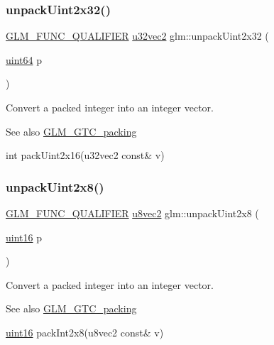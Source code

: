 \subsubsection{\texorpdfstring{unpack\+Uint2x32()}{unpackUint2x32()}}
{\footnotesize\ttfamily \mbox{\hyperlink{setup_8hpp_a33fdea6f91c5f834105f7415e2a64407}{G\+L\+M\+\_\+\+F\+U\+N\+C\+\_\+\+Q\+U\+A\+L\+I\+F\+I\+ER}} \mbox{\hyperlink{group__gtc__type__precision_gad854a1005ce84d8f6e8f05e42893f5c9}{u32vec2}} glm\+::unpack\+Uint2x32 (\begin{DoxyParamCaption}\item[{\mbox{\hyperlink{group__gtc__type__precision_gae3632bf9b37da66233d78930dd06378a}{uint64}}}]{p }\end{DoxyParamCaption})}

Convert a packed integer into an integer vector.

\begin{DoxySeeAlso}{See also}
\mbox{\hyperlink{group__gtc__packing}{G\+L\+M\+\_\+\+G\+T\+C\+\_\+packing}} 

int pack\+Uint2x16(u32vec2 const\& v) 
\end{DoxySeeAlso}
\mbox{\label{group__gtc__packing_ga060e0e7e299aa73ff869c197ebf44210}} 
\subsubsection{\texorpdfstring{unpack\+Uint2x8()}{unpackUint2x8()}}
{\footnotesize\ttfamily \mbox{\hyperlink{setup_8hpp_a33fdea6f91c5f834105f7415e2a64407}{G\+L\+M\+\_\+\+F\+U\+N\+C\+\_\+\+Q\+U\+A\+L\+I\+F\+I\+ER}} \mbox{\hyperlink{group__gtc__type__precision_ga01e28d0272428f94d22ea6111f0112be}{u8vec2}} glm\+::unpack\+Uint2x8 (\begin{DoxyParamCaption}\item[{\mbox{\hyperlink{group__gtc__type__precision_gad8c2939e1fdd8e5828b31d95c52255d5}{uint16}}}]{p }\end{DoxyParamCaption})}

Convert a packed integer into an integer vector.

\begin{DoxySeeAlso}{See also}
\mbox{\hyperlink{group__gtc__packing}{G\+L\+M\+\_\+\+G\+T\+C\+\_\+packing}} 

\mbox{\hyperlink{group__gtc__type__precision_gad8c2939e1fdd8e5828b31d95c52255d5}{uint16}} pack\+Int2x8(u8vec2 const\& v) 
\end{DoxySeeAlso}
\mbox{\label{group__gtc__packing_gaf1eea82404af955004aae19a2dcb55f1}} 
